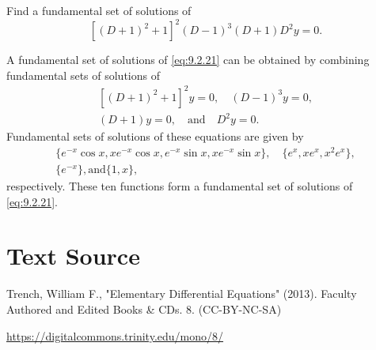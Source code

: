\documentclass{ximera}
\begin{document}
\begin{example}\label{example:9.2.8}
Find a fundamental set of solutions of
\begin{equation} \label{eq:9.2.21}
[(D+1)^2+1]^2(D-1)^3(D+1)D^2y=0.
\end{equation}


\begin{explanation} A fundamental set of solutions of \eqref{eq:9.2.21} can be
obtained by combining fundamental sets of solutions of
$$
\begin{array}{c}
\left[(D+1)^2+1\right]^2 y=0,\quad (D-1)^3 y=0,\\
(D+1)y=0,\quad \mbox{and} \quad D^2y=0.
\end{array}
$$
Fundamental sets of solutions of these equations are given by
$$
\begin{array}{c}
\{e^{-x}\cos x, xe^{-x}\cos x, e^{-x}\sin x, xe^{-x}\sin
x\},\quad \{e^x, xe^x, x^2e^x\},\\
\{e^{-x}\},\mbox{and} \{1,x\},
\end{array}
$$
respectively. These ten functions form a fundamental set of solutions
of \eqref{eq:9.2.21}.
\end{explanation}
\end{example}


\section*{Text Source}
Trench, William F., "Elementary Differential Equations" (2013). Faculty Authored and Edited Books \& CDs. 8. (CC-BY-NC-SA)

\href{https://digitalcommons.trinity.edu/mono/8/}{https://digitalcommons.trinity.edu/mono/8/}
\end{document}
